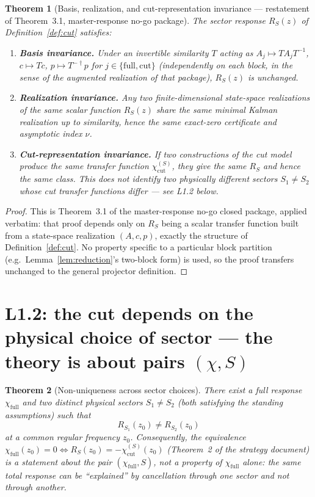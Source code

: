 \documentclass[11pt,a4paper]{article}
\newtheorem{theorem}{Theorem}[section]
\theoremstyle{remark}
\begin{document}
\begin{theorem}[Basis, realization, and cut-representation invariance
--- restatement of Theorem~3.1, master-response no-go package]
\label{thm:invariance}
The sector response $R_S(z)$ of Definition~\ref{def:cut} satisfies:
\begin{enumerate}[label=(\roman*)]
\item \textbf{Basis invariance.} Under an invertible similarity
$T$ acting as $A_j\mapsto TA_jT^{-1}$, $c\mapsto Tc$,
$p\mapsto T^{-\dagger}p$ for $j\in\{\mathrm{full,cut}\}$ (independently on
each block, in the sense of the augmented realization of that package),
$R_S(z)$ is unchanged.
\item \textbf{Realization invariance.} Any two finite-dimensional
state-space realizations of the same scalar function $R_S(z)$ share the
same minimal Kalman realization up to similarity, hence the same exact-zero
certificate and asymptotic index $\nu$.
\item \textbf{Cut-representation invariance.} If two constructions of the
cut model produce the same transfer function $\chi^{(S)}_{\mathrm{cut}}$,
they give the same $R_S$ and hence the same class. This does \emph{not}
identify two physically different sectors $S_1\neq S_2$ whose cut transfer
functions differ --- see L1.2 below.
\end{enumerate}
\end{theorem}

\begin{proof}
This is Theorem~3.1 of the master-response no-go closed package, applied
verbatim: that proof depends only on $R_S$ being a scalar transfer function
built from a state-space realization $(A,c,p)$, exactly the structure of
Definition~\ref{def:cut}. No property specific to a particular block
partition (e.g.\ Lemma~\ref{lem:reduction}'s two-block form) is used, so the
proof transfers unchanged to the general projector definition.
\end{proof}

\section{L1.2: the cut depends on the physical choice of sector ---
the theory is about pairs $(\chi,S)$}

\begin{theorem}[Non-uniqueness across sector choices]\label{thm:L12}
There exist a full response $\chi_{\mathrm{full}}$ and two distinct
physical sectors $S_1\neq S_2$ (both satisfying the standing assumptions)
such that
\[
R_{S_1}(z_0)\neq R_{S_2}(z_0)
\]
at a common regular frequency $z_0$. Consequently, the equivalence
$\chi_{\mathrm{full}}(z_0)=0\iff R_S(z_0)=-\chi^{(S)}_{\mathrm{cut}}(z_0)$
(Theorem~2 of the strategy document) is a statement about the pair
$(\chi_{\mathrm{full}},S)$, not a property of $\chi_{\mathrm{full}}$ alone:
the same total response can be ``explained'' by cancellation through one
sector and not through another.
\end{theorem}
\end{document}
